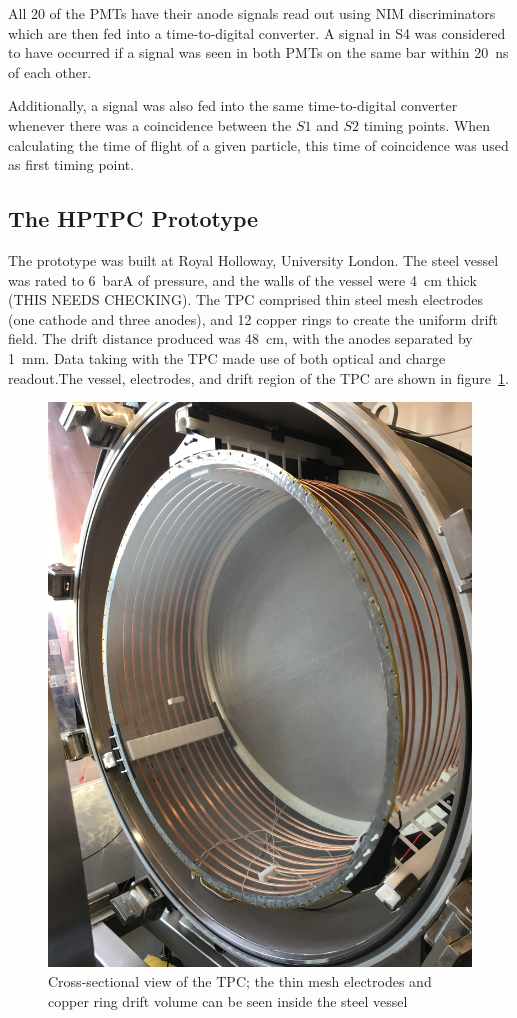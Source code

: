 All 20 of the PMTs have their anode signals read out using NIM discriminators which are then fed into a time-to-digital converter. A signal in S4 was considered to have occurred if a signal was seen in both PMTs on the same bar within 20~ns of each other. 

Additionally, a signal was also fed into the same time-to-digital converter whenever there was a coincidence between the $S1$ and $S2$ timing points. When calculating the time of flight of a given particle, this time of coincidence was used as first timing point.

\subsection{The HPTPC Prototype}
The prototype was built at Royal Holloway, University London.  The steel vessel was rated to 6~barA of pressure, and the walls of the vessel were 4~cm thick (THIS NEEDS CHECKING).
The TPC comprised thin steel mesh electrodes (one cathode and three anodes), and 12 copper rings to create the uniform drift field. The drift distance produced was 48~cm, with the anodes separated by 1~mm. Data taking with the TPC made use of both optical and charge readout.The vessel, electrodes, and drift region of the TPC are shown in figure~\ref{fig:TPC}.
    
     \begin{figure}
      \centering
    \includegraphics[width=0.6\linewidth]{files/Figures/IMG_1194.jpg}
    	\caption{Cross-sectional view of the TPC; the thin mesh electrodes and copper ring drift volume can be seen inside the steel vessel}
    		\label{fig:TPC}
    \end{figure}
    
